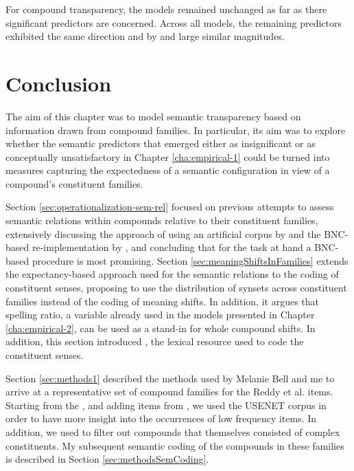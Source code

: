 For compound transparency, the models remained unchanged as far as
there significant predictors are concerned. Across all models, the
remaining predictors exhibited the same direction and by and large
similar magnitudes.


\section{Conclusion}
\label{sec:emp2-conclusion}

The aim of this chapter was to model semantic transparency based on information
drawn from compound families. In particular, its aim was to explore
whether the semantic predictors that emerged either as insignificant
or as conceptually unsatisfactory in Chapter \ref{cha:empirical-1}
could be turned into measures capturing the expectedness of a semantic
configuration in view of a compound's constituent families. 

Section \ref{sec:operationalization-sem-rel} focused on previous
attempts to assess semantic
relations within compounds relative to their constituent
families, extensively discussing the approach of using an artificial corpus by
\citet{GagneandShoben:1997} and the BNC-based re-implementation by
\citet{Maguireetal:2007}, and concluding that for the task at hand a
BNC-based procedure is most promising.  Section
\ref{sec:meaningShiftsInFamilies} extends the expectancy-based
approach used for the semantic relations to the coding of constituent
senses, proposing to use the distribution of  synsets across
constituent families instead of the coding of meaning shifts. In addition, it argues that spelling ratio, a variable already
used in the models presented in Chapter \ref{cha:empirical-2}, can be
used as a stand-in for whole compound shifts. In addition, this
section introduced , the lexical resource used to code the
constituent senses.

Section \ref{sec:methods1} described the methods used by
Melanie Bell and me to arrive
at a representative set of compound families for the
Reddy et al. items. Starting from the , and adding items from
, we used the USENET corpus in order to have more insight into
the occurrences of low frequency items. In addition, we used  to
filter out compounds that themselves consisted of complex
constituents. 
My subsequent semantic coding of the compounds in
these families is described in Section \ref{sec:methodsSemCoding}.

